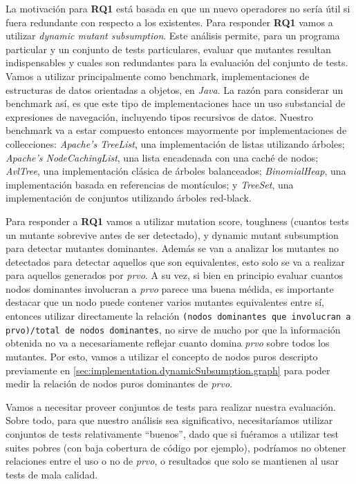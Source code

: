 La motivaci\'on para \textbf{RQ1} est\'a basada en que un nuevo operadores no ser\'ia \'util si fuera redundante con respecto a los existentes. Para responder \textbf{RQ1} vamos a utilizar \emph{dynamic mutant subsumption}. Este an\'alisis permite, para un programa particular y un conjunto de tests particulares, evaluar que mutantes resultan indispensables y cuales son redundantes para la evaluaci\'on del conjunto de tests. Vamos a utilizar principalmente como benchmark, implementaciones de estructuras de datos orientadas a objetos, en \emph{Java}. La raz\'on para considerar un benchmark as\'i, es que este tipo de implementaciones hace un uso substancial de expresiones de navegaci\'on, incluyendo tipos recursivos de datos. Nuestro benchmark va a estar compuesto entonces mayormente por implementaciones de collecciones:  \emph{Apache's TreeList}, una implementaci\'on de listas utilizando \'arboles; \emph{Apache's NodeCachingList}, una lista encadenada con una cach\'e de nodos; \emph{AvlTree}, una implementaci\'on cl\'asica de \'arboles balanceados; \emph{BinomialHeap}, una implementaci\'on basada en referencias de mont\'iculos; y \emph{TreeSet}, una implementaci\'on de conjuntos utilizando \'arboles red-black. %

Para responder a \textbf{RQ1} vamos a utilizar mutation score, toughness (cuantos tests un mutante sobrevive antes de ser detectado), y dynamic mutant subsumption para detectar mutantes dominantes. Adem\'as se van a analizar los mutantes no detectados para detectar aquellos que son equivalentes, esto solo se va a realizar para aquellos generados por \emph{prvo}. A su vez, si bien en principio evaluar cuantos nodos dominantes involucran a \emph{prvo} parece una buena m\'edida, es importante destacar que un nodo puede contener varios mutantes equivalentes entre s\'i, entonces utilizar directamente la relaci\'on \texttt{(nodos dominantes que involucran a prvo)/total de nodos dominantes}, no sirve de mucho por que la informaci\'on obtenida no va a necesariamente reflejar cuanto domina \emph{prvo} sobre todos los mutantes. Por esto, vamos a utilizar el concepto de nodos puros descripto previamente en \ref{sec:implementation.dynamicSubsumption.graph} para poder medir la relaci\'on de nodos puros dominantes de \emph{prvo}.

Vamos a necesitar proveer conjuntos de tests para realizar nuestra evaluaci\'on. Sobre todo, para que nuestro an\'alisis sea significativo, necesitar\'iamos utilizar conjuntos de tests relativamente ``buenos'', dado que si fu\'eramos a utilizar test suites pobres (con baja cobertura de c\'odigo por ejemplo), podr\'iamos no obtener relaciones entre el uso o no de \emph{prvo}, o resultados que solo se mantienen al usar tests de mala calidad.

